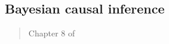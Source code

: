 \documentclass[12pt]{article}
\begin{document}
\begin{verse}  \end{verse}

\begin{verse}  \end{verse}

\begin{verse}  \end{verse}

\subsection{Bayesian causal inference}

\begin{verse}  \end{verse}

\begin{verse} Chapter 8 of  \end{verse}

\begin{verse}  \end{verse}

\begin{verse}  \end{verse}

\begin{verse}  \end{verse}

\clearpage


\clearpage

\end{document}
